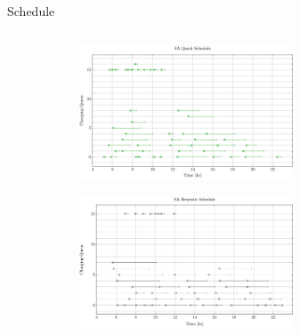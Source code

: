 \documentclass[aspectratio=169,dvipsnames]{beamer}
\begin{document}
\begin{frame}[label={sec:orgb052525}]{Schedule}
\begin{columns}
\begin{column}{0.5\columnwidth}
\begin{figure}
\begin{subfigure}[t]{\textwidth}
\centering
    \includegraphics[width=0.7\textwidth]{img/sa-pap-paper-good/schedule-sa-quick}
\end{subfigure}
\begin{subfigure}[t]{\textwidth}
\centering
    \includegraphics[width=0.7\textwidth]{img/sa-pap-paper-good/schedule-sa-heuristic}
\end{subfigure}
\end{figure}
\end{column}
\end{columns}
\end{frame}
\end{document}
